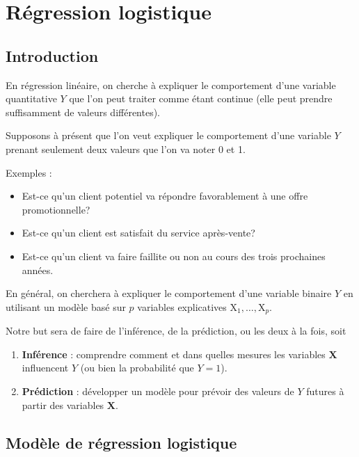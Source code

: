 \documentclass[
  11pt,
  letterpaper,
]{scrbook}
\providecommand{\tightlist}{%
  \setlength{\itemsep}{0pt}\setlength{\parskip}{0pt}}\usepackage{longtable,booktabs,array}
\theoremstyle{definition}
\theoremstyle{remark}
\begin{document}

\chapter{Régression logistique}\label{regression-logistique}

\section{Introduction}\label{introduction-1}

En régression linéaire, on cherche à expliquer le comportement d'une
variable quantitative \(Y\) que l'on peut traiter comme étant continue
(elle peut prendre suffisamment de valeurs différentes).

Supposons à présent que l'on veut expliquer le comportement d'une
variable \(Y\) prenant seulement deux valeurs que l'on va noter 0 et 1.

Exemples :

\begin{itemize}
\tightlist
\item
  Est-ce qu'un client potentiel va répondre favorablement à une offre
  promotionnelle?
\item
  Est-ce qu'un client est satisfait du service après-vente?
\item
  Est-ce qu'un client va faire faillite ou non au cours des trois
  prochaines années.
\end{itemize}

En général, on cherchera à expliquer le comportement d'une variable
binaire \(Y\) en utilisant un modèle basé sur \(p\) variables
explicatives \(\mathrm{X}_1, \ldots, \mathrm{X}_p\).

Notre but sera de faire de l'inférence, de la prédiction, ou les deux à
la fois, soit

\begin{enumerate}
\def\labelenumi{\arabic{enumi})}
\tightlist
\item
  \textbf{Inférence} : comprendre comment et dans quelles mesures les
  variables \(\mathbf{X}\) influencent \(Y\) (ou bien la probabilité que
  \(Y=1\)).
\item
  \textbf{Prédiction} : développer un modèle pour prévoir des valeurs de
  \(Y\) futures à partir des variables \(\mathbf{X}\).
\end{enumerate}

\section{Modèle de régression
logistique}\label{moduxe8le-de-ruxe9gression-logistique}
\end{document}
